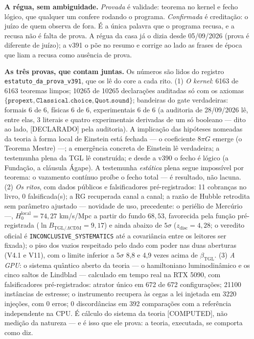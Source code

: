 \documentclass[11pt]{article}
\theoremstyle{definition}\newtheorem{deriv}{Derivação}
\begin{document}
\textbf{A régua, sem ambiguidade.} \emph{Provada} é validade: teorema no kernel e fecho lógico, que qualquer um confere rodando o programa. \emph{Confirmada} é creditação: o juízo de quem observa de fora. É a única palavra que o programa recusa, e a recusa não é falta de prova. A régua da casa já o dizia desde 05/09/2026 (prova é diferente de juízo); a v391 o põe no resumo e corrige ao lado as frases de época que liam a recusa como ausência de prova.

\textbf{As três provas, que contam juntas.} Os números são lidos do registro \texttt{estatuto\_da\_prova\_v391}, que os lê do core a cada rito. (1) \emph{O kernel}: 6163 de 6163 teoremas limpos; 10265 de 10265 declarações auditadas só com os axiomas $\{\texttt{propext},\texttt{Classical.choice},\texttt{Quot.sound}\}$; bandeiras do gate verdadeiras: formais 6 de 6, físicas 6 de 6, experimentais 6 de 6 (a auditoria de 28/09/2026 lê, entre elas, 3 literais e quatro experimentais derivadas de um só booleano --- dito ao lado, \textsf{[DECLARADO]} pela auditoria). A implicação das hipóteses nomeadas da teoria à forma local de Einstein está fechada --- o coeficiente $8\pi G$ emerge (o Teorema Mestre) ---; a emergência concreta de Einstein lê verdadeira; a testemunha plena da TGL lê construída; e desde a v390 o fecho é lógico (a Fundação, a cláusula Ágape). A testemunha \emph{estática} plena segue impossível por teorema: o vazamento contínuo proíbe o fecho total --- é resultado, não lacuna. (2) \emph{Os ritos}, com dados públicos e falsificadores pré-registrados: 11 cobranças no livro, 0 falsificada(s); a RG recuperada canal a canal; a razão de Hubble retrodita sem parâmetro ajustado --- novidade de uso, precedente: o periélio de Mercúrio ---, $H_0^{\mathrm{local}}=74{,}27$ km/s/Mpc a partir do fundo $68{,}53$, favorecida pela função pré-registrada ($\ln B_{\mathrm{TGL}/\Lambda\mathrm{CDM}}=9{,}17$) e ainda abaixo de $5\sigma$ ($z_{\mathrm{disc}}=4{,}28$; o veredito oficial é \texttt{INCONCLUSIVE\_SYSTEMATICS} até a covariância entre os leitores ser fixada); o piso dos vazios respeitado pelo dado com poder nas duas aberturas (V4.1 e V11), com o limite inferior a $5\sigma$ 8{,}8 e 4{,}9 vezes acima de $\beta_{\mathrm{TGL}}$. (3) \emph{A GPU}: o sistema quântico aberto da teoria --- o hamiltoniano luminodinâmico e os cinco saltos de Lindblad --- calculado em tempo real na RTX 5090, com falsificadores pré-registrados: atrator único em 672 de 672 configurações; 21100 instâncias de estresse; o instrumento recupera às cegas a lei injetada em 3220 injeções, com 0 erros; 0 discordâncias em 392 comparações com a referência independente na CPU. É cálculo do sistema da teoria \textsf{[COMPUTED]}, não medição da natureza --- e é isso que ele prova: a teoria, executada, se comporta como diz.
\end{document}
